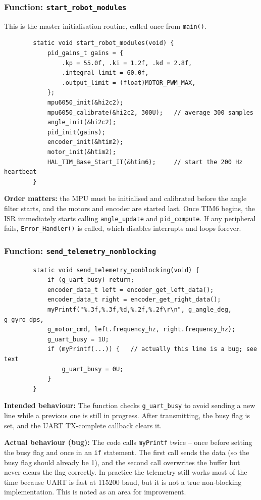 \documentclass[12pt,a4paper]{article}
\newcommand{\func}[1]{\texttt{#1}}
\begin{document}
	\subsubsection*{Function: \func{start\_robot\_modules}}
	This is the master initialisation routine, called once from \texttt{main()}.
	\begin{lstlisting}
		static void start_robot_modules(void) {
			pid_gains_t gains = {
				.kp = 55.0f, .ki = 1.2f, .kd = 2.8f,
				.integral_limit = 60.0f,
				.output_limit = (float)MOTOR_PWM_MAX,
			};
			mpu6050_init(&hi2c2);
			mpu6050_calibrate(&hi2c2, 300U);   // average 300 samples
			angle_init(&hi2c2);
			pid_init(gains);
			encoder_init(&htim2);
			motor_init(&htim2);
			HAL_TIM_Base_Start_IT(&htim6);     // start the 200 Hz heartbeat
		}
	\end{lstlisting}
	\textbf{Order matters:} the MPU must be initialised and calibrated before the angle filter starts, and the motors and encoder are started last. Once TIM6 begins, the ISR immediately starts calling \texttt{angle\_update} and \texttt{pid\_compute}. If any peripheral fails, \texttt{Error\_Handler()} is called, which disables interrupts and loops forever.
	
	\newpage
	
	\subsubsection*{Function: \func{send\_telemetry\_nonblocking}}
	\begin{lstlisting}
		static void send_telemetry_nonblocking(void) {
			if (g_uart_busy) return;
			encoder_data_t left = encoder_get_left_data();
			encoder_data_t right = encoder_get_right_data();
			myPrintf("%.3f,%.3f,%d,%.2f,%.2f\r\n", g_angle_deg, g_gyro_dps,
			g_motor_cmd, left.frequency_hz, right.frequency_hz);
			g_uart_busy = 1U;
			if (myPrintf(...)) {   // actually this line is a bug; see text
				g_uart_busy = 0U;
			}
		}
	\end{lstlisting}
	\textbf{Intended behaviour:} The function checks \texttt{g\_uart\_busy} to avoid sending a new line while a previous one is still in progress. After transmitting, the busy flag is set, and the UART TX‑complete callback clears it.
	
	\textbf{Actual behaviour (bug):} The code calls \texttt{myPrintf} twice -- once before setting the busy flag and once in an \texttt{if} statement. The first call sends the data (so the busy flag should already be 1), and the second call overwrites the buffer but never clears the flag correctly. In practice the telemetry still works most of the time because UART is fast at 115200 baud, but it is not a true non‑blocking implementation. This is noted as an area for improvement.
	
\end{document}
